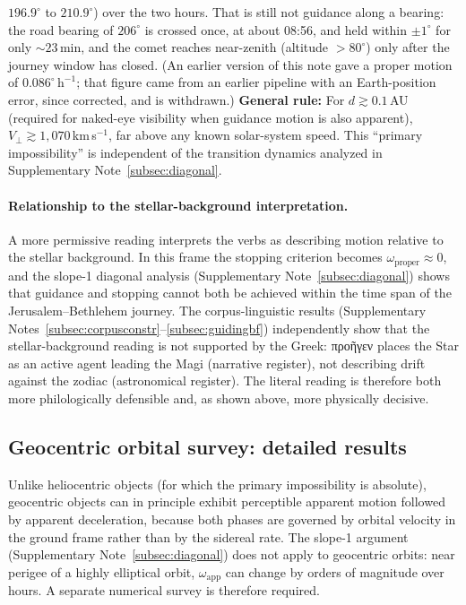 \documentclass[11pt,a4paper]{article}
\newcommand{\grk}[1]{{\fontencoding{LGR}\selectfont #1}}
\newcommand{\grk}[1]{{\greekfont #1}}
\begin{document}
\begin{table}[h]
\begin{minipage}{0.9\linewidth}
    $196.9^\circ$ to $210.9^\circ$) over the two hours. That is still not
    guidance along a bearing: the road bearing of $206^\circ$ is crossed once,
    at about 08:56, and held within $\pm1^\circ$ for only ${\sim}23$\,min, and
    the comet reaches near-zenith (altitude $>80^\circ$) only after the journey
    window has closed. (An earlier version of this note gave a proper motion of
    $0.086^\circ\,\mathrm{h}^{-1}$; that figure came from an earlier pipeline
    with an Earth-position error, since corrected, and is withdrawn.)
    \textbf{General rule:} For $d \gtrsim 0.1$\,AU (required for naked-eye
    visibility when guidance motion is also apparent), $V_\perp \gtrsim
    1{,}070$\,km\,s$^{-1}$, far above any known solar-system speed.
    This ``primary impossibility'' is independent of the transition dynamics
    analyzed in Supplementary Note~\ref{subsec:diagonal}.
  \end{minipage}
\end{table}

\paragraph{Relationship to the stellar-background interpretation.}
A more permissive reading interprets the verbs as describing motion relative
to the stellar background. In this frame the stopping criterion becomes
$\omega_\mathrm{proper} \approx 0$, and the slope-1 diagonal analysis
(Supplementary Note~\ref{subsec:diagonal}) shows that guidance and stopping cannot both be achieved within
the time span of the Jerusalem--Bethlehem journey. The corpus-linguistic
results (Supplementary Notes~\ref{subsec:corpusconstr}--\ref{subsec:guidingbf}) independently show that the stellar-background
reading is not supported by the Greek: \grk{προῆγεν} places the Star as
an active agent leading the Magi (narrative register), not describing drift
against the zodiac (astronomical register). The literal reading is
therefore both more philologically defensible and, as shown above, more
physically decisive.

\subsection{Geocentric orbital survey: detailed results}
\label{subsec:geocentric_detail}

Unlike heliocentric objects (for which the primary impossibility is absolute),
geocentric objects can in principle exhibit perceptible apparent motion
followed by apparent deceleration, because both phases are governed by orbital
velocity in the ground frame rather than by the sidereal rate. The slope-1
argument (Supplementary Note~\ref{subsec:diagonal}) does not apply to geocentric orbits: near perigee of a
highly elliptical orbit, $\omega_\mathrm{app}$ can change by orders of
magnitude over hours. A separate numerical survey is therefore required.
\end{document}
